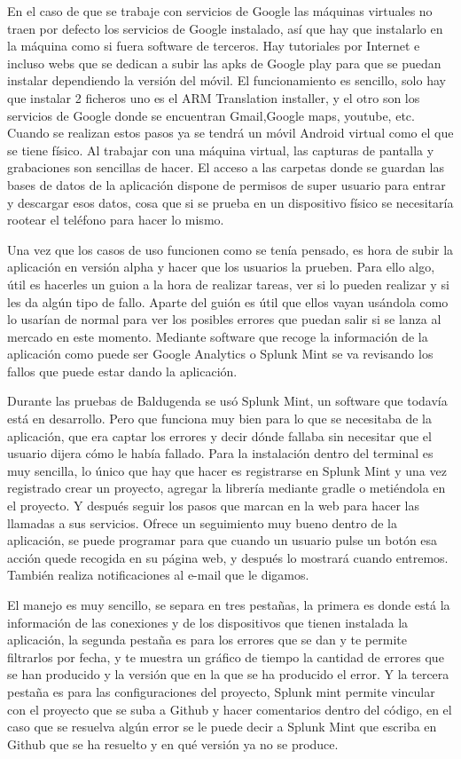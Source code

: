 En el caso de que se trabaje con servicios de Google las máquinas virtuales no traen por defecto los servicios de Google instalado, así que hay que instalarlo en la máquina como si fuera software de terceros. Hay tutoriales por Internet e incluso webs que se dedican a subir las apks de Google play para que se puedan instalar dependiendo la versión del móvil.
El funcionamiento es sencillo, solo hay que instalar 2 ficheros uno es el ARM Translation installer, y el otro son los servicios de Google donde se encuentran Gmail,Google maps, youtube, etc.
Cuando se realizan estos pasos ya se tendrá un móvil Android virtual como el que se tiene físico.
Al trabajar con una máquina virtual, las capturas de pantalla y grabaciones son sencillas de hacer. El acceso a las carpetas donde se guardan las bases de datos de la aplicación dispone de permisos de super usuario para entrar y descargar esos datos, cosa que si se prueba en un dispositivo físico se necesitaría rootear el teléfono para hacer lo mismo.

Una vez que los casos de uso funcionen como se tenía pensado, es hora de subir la aplicación en versión alpha y hacer que los usuarios la prueben.
Para ello algo, útil es hacerles un guion a la hora de realizar tareas, ver si lo pueden realizar y si les da algún tipo de fallo.
Aparte del guión es útil que ellos vayan usándola como lo usarían de normal para ver los posibles errores que puedan salir si se lanza al mercado en este momento.
Mediante software que recoge la información de la aplicación como puede ser Google Analytics o Splunk Mint se va revisando los fallos que puede estar dando la aplicación.

Durante las pruebas de Baldugenda se usó Splunk Mint, un software que todavía está en desarrollo. Pero que funciona muy bien para lo que se necesitaba de la aplicación, que era captar los errores y decir dónde fallaba sin necesitar que el usuario dijera cómo le había fallado.
Para la instalación dentro del terminal es muy sencilla, lo único que hay que hacer es registrarse en Splunk Mint y una vez registrado crear un proyecto, agregar la librería mediante gradle o metiéndola en el proyecto.
Y después seguir los pasos que marcan en la web para hacer las llamadas a sus servicios.
Ofrece un seguimiento muy bueno dentro de la aplicación, se puede programar para que cuando un usuario pulse un botón esa acción quede recogida en su página web, y después lo mostrará cuando entremos. También realiza notificaciones al e-mail que le digamos.

El manejo es muy sencillo, se separa en tres pestañas, la primera es donde está la información de las conexiones y de los dispositivos que tienen instalada la aplicación, la segunda pestaña es para los errores que se dan y te permite filtrarlos por fecha, y te muestra un gráfico de tiempo la cantidad de errores que se han producido y la versión que en la que se ha producido el error. Y la tercera pestaña es para las configuraciones del proyecto, Splunk mint permite vincular con el proyecto que se suba a Github y hacer comentarios dentro del código, en el caso que se resuelva algún error se le puede decir a Splunk Mint que escriba en Github que se ha resuelto y en qué versión ya no se produce.

